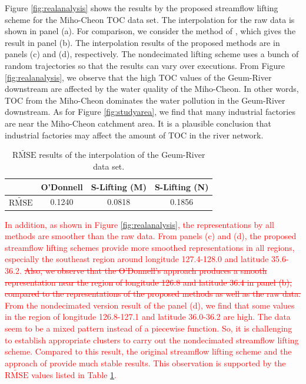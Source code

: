 \documentclass[11pt,titlepage]{article}
\begin{document}
Figure \ref{fig:realanalysis} shows the results by the proposed streamflow lifting scheme for the Miho-Cheon TOC data set. The interpolation for the raw data is shown in panel (a). For comparison, we consider the method of \cite{ODonnell2014}, which gives  the result in panel (b). The interpolation results of the proposed methods are in panels (c) and (d), respectively. The nondecimated lifting scheme uses a bunch of random trajectories so that the results can vary over executions. From Figure \ref{fig:realanalysis}, we observe that the high TOC values of the Geum-River downstream are affected by the water quality of the Miho-Cheon. In other words, TOC from the Miho-Cheon dominates the water pollution in the Geum-River downstream. As for Figure \ref{fig:studyarea}, we find that many industrial factories are near the Miho-Cheon catchment area. It is a plausible conclusion that industrial factories may affect the amount of TOC in the river network.

\begin{table}[]
	\centering
	\caption{$\widetilde{\text{RMSE}}$ results of the interpolation of the Geum-River data set.}
	\begin{tabular}{|c|c|c|c|}
		\hline
		& O'Donnell & S-Lifting (M) & S-Lifting (N) \\ \hline
		$\widetilde{\text{RMSE}}$ & 0.1240   & 0.0818        & 0.1856        \\ \hline
	\end{tabular}
	\label{table:realanalysis}
\end{table}

\textcolor{red}{In addition, as shown in Figure \ref{fig:realanalysis}, the representations by all methods are smoother than the raw data. From panels (c) and (d), the proposed streamflow lifting schemes provide more smoothed representations in all regions, especially the southeast region around longitude 127.4-128.0 and latitude 35.6-36.2. \sout{Also, we observe that the O'Donnell's approach produces a smooth representation near the region of longitude 126.8 and latitude 36.4 in panel (b), compared to the representations of the proposed methods as well as the raw data.}
From the nondecimated version result of the panel (d), we find that some values in the region of longitude 126.8-127.1 and latitude 36.0-36.2 are high. The data seem to be a mixed pattern instead of a piecewise function. So, it is challenging to establish appropriate clusters to carry out  the nondecimated streamflow lifting scheme. Compared to this result, the original streamflow lifting scheme and the approach of \cite{ODonnell2014} provide much stable results. This observation is supported by the $\widetilde{\text{RMSE}}$ values listed in Table \ref{table:realanalysis}. }
\end{document}
